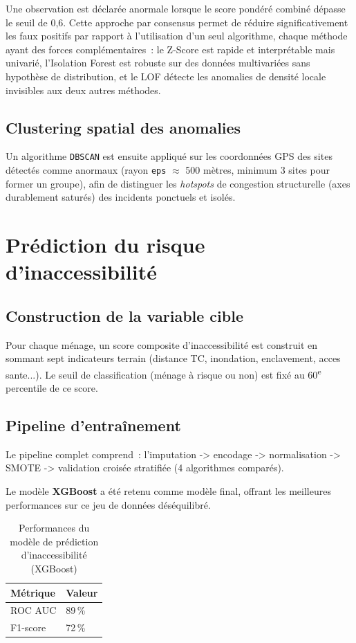 Une observation est déclarée anormale lorsque le score pondéré combiné dépasse le seuil de 0,6. Cette approche par consensus permet de réduire significativement les faux positifs par rapport à l'utilisation d'un seul algorithme, chaque méthode ayant des forces complémentaires~: le Z-Score est rapide et interprétable mais univarié, l'Isolation Forest est robuste sur des données multivariées sans hypothèse de distribution, et le LOF détecte les anomalies de densité locale invisibles aux deux autres méthodes.

\subsection{Clustering spatial des anomalies}
Un algorithme \texttt{DBSCAN} est ensuite appliqué sur les coordonnées GPS des sites détectés comme anormaux (rayon \texttt{eps} $\approx$ 500 mètres, minimum 3 sites pour former un groupe), afin de distinguer les \emph{hotspots} de congestion structurelle (axes durablement saturés) des incidents ponctuels et isolés.

\section{Prédiction du risque d'inaccessibilité}

\subsection{Construction de la variable cible}
Pour chaque ménage, un score composite d'inaccessibilité est construit en sommant sept indicateurs terrain (distance TC, inondation, enclavement, acces sante...). Le seuil de classification (ménage à risque ou non) est fixé au 60\textsuperscript{e} percentile de ce score.

\subsection{Pipeline d'entraînement}
Le pipeline complet comprend~: l'imputation -> encodage -> normalisation -> SMOTE -> validation croisée stratifiée (4 algorithmes comparés).

Le modèle \textbf{XGBoost} a été retenu comme modèle final, offrant les meilleures performances sur ce jeu de données déséquilibré.

\begin{table}[H]
\centering
\caption{Performances du modèle de prédiction d'inaccessibilité (XGBoost)}
\begin{tabular}{ll}
\toprule
\textbf{Métrique} & \textbf{Valeur} \\
\midrule
ROC AUC & 89\,\% \\
F1-score & 72\,\% \\
\bottomrule
\end{tabular}
\end{table}

